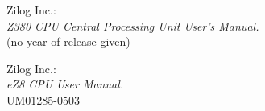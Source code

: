\documentclass[12pt,twoside]{report}
\begin{document}
\begin{thebibliography}{99}
 Zilog Inc.: \\
                  {\em Z380 CPU Central Processing Unit User's
                  Manual.\/} \\
                  (no year of release given)

 Zilog Inc.: \\
               {\em eZ8 CPU User Manual.\/} \\
               UM01285-0503

\end{thebibliography}

\cleardoublepage

\printindex
\end{document}
